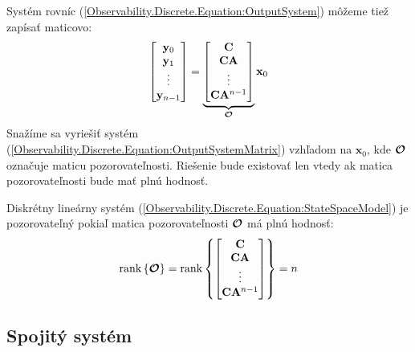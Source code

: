 \documentclass[a4paper, 10pt, ]{article}
\begin{document}
Systém rovníc (\ref{Observability.Discrete.Equation:OutputSystem}) môžeme tiež zapísať maticovo:
\begin{equation}
    \label{Observability.Discrete.Equation:OutputSystemMatrix}
    \begin{bmatrix}
        \mathbf{y}_{0}     \\
        \mathbf{y}_{1}     \\
        \vdots         \\
        \mathbf{y}_{n - 1} \\
    \end{bmatrix} = 
    \underbrace{
        \begin{bmatrix}
            \mathbf{C}                \\
            \mathbf{C} \mathbf{A}         \\
            \vdots                \\
            \mathbf{C} \mathbf{A}^{n - 1} \\
        \end{bmatrix}
    }_{\boldsymbol{\mathcal{O}}}
    \mathbf{x}_0
\end{equation}
Snažíme sa vyriešiť systém (\ref{Observability.Discrete.Equation:OutputSystemMatrix}) vzhľadom na $\bm{x}_{0}$, kde $\boldsymbol{\mathcal{O}}$ označuje maticu pozorovateľnosti. Riešenie bude existovať len vtedy ak matica pozorovateľnosti bude mať plnú hodnosť.

\begin{theorem}
    Diskrétny lineárny systém (\ref{Observability.Discrete.Equation:StateSpaceModel}) je pozorovateľný pokiaľ matica pozorovateľnosti $\boldsymbol{\mathcal{O}}$ má plnú hodnosť:
    \begin{equation}
        \label{Observability.Discrete.Equation:ObservabilityTheorem}
        \mathrm{rank} \left\{ \boldsymbol{\mathcal{O}} \right\} = 
        \mathrm{rank} \left\{
            \begin{bmatrix}
                \mathbf{C}                \\
                \mathbf{C} \mathbf{A}         \\
                \vdots                \\
                \mathbf{C} \mathbf{A}^{n - 1} \\
            \end{bmatrix}
        \right\} = 
        n
    \end{equation}
\end{theorem}


\subsection{Spojitý systém}
\end{document}
